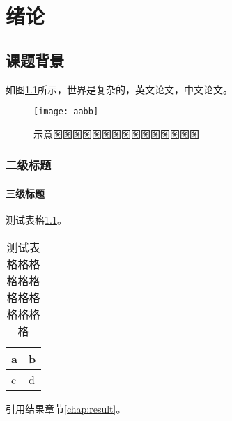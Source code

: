\chapter{绪论}
\section{课题背景}

如图\ref{fig:aabb}所示，世界是复杂的，英文论文\cite{fang2018quadrangulation}，中文论文\cite{sibianxingwanggezhiliang}。

\begin{figure}[h]
    \centering
    \texttt{[image: aabb]}
    \caption[示意图]{示意图图图图图图图图图图图图图图图}
    \label{fig:aabb}
\end{figure}

\subsection{二级标题}

\subsubsection{三级标题}

测试表格\ref{tb:test}。

\begin{table}[h]
    \centering
    \begin{tabular}{|l|l|}
        \hline
        a & b \\ \hline
        c & d \\ \hline
    \end{tabular}
    \caption[测试表格]{测试表格格格格格格格格格格格格格}
    \label{tb:test}
\end{table}

引用结果章节\ref{chap:result}。
